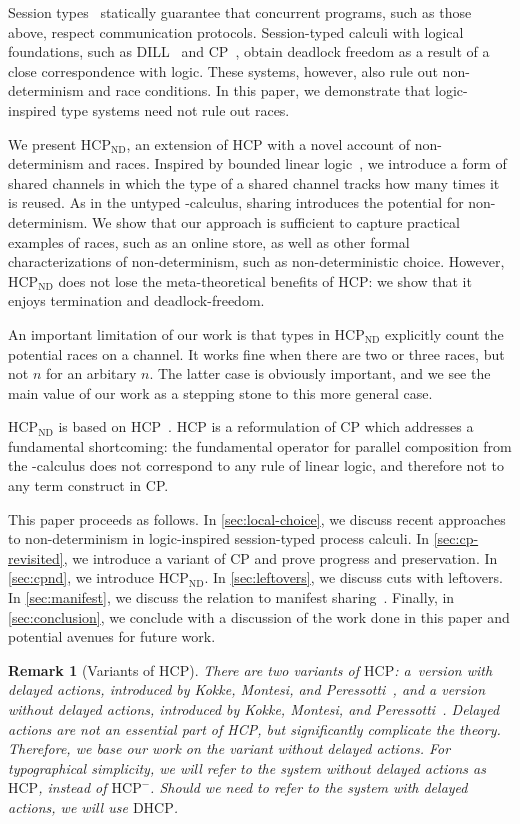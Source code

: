 \documentclass{lmcs}
\providecommand{\dhcp}{\ensuremath{\text{DHCP}}\xspace}
\providecommand{\hcp}{\ensuremath{\text{HCP}}\xspace}
\providecommand{\nodcap}{\ensuremath{\hcp_{\text{ND}}}\xspace}
\providecommand{\piDILL}{\textpi DILL\xspace}
\providecommand{\cp}{CP\xspace}
\newtheorem*{remark}{Remark}
\begin{document}
Session types~\cite{honda1993} statically guarantee that concurrent programs, such as those above, respect communication protocols. Session-typed calculi with logical foundations, such as \piDILL~\cite{caires2010} and CP~\cite{wadler2012}, obtain deadlock freedom as a result of a close correspondence with logic. These systems, however, also rule out non-determinism and race conditions. In this paper, we demonstrate that logic-inspired type systems need not rule out races.

We present \nodcap, an extension of \hcp with a novel account of non-determinism and races. Inspired by bounded linear logic~\cite{girard1992}, we introduce a form of shared channels in which the type of a shared channel tracks how many times it is reused. As in the untyped \textpi-calculus, sharing introduces the potential for non-determinism. We show that our approach is sufficient to capture practical examples of races, such as an online store, as well as other formal characterizations of non-determinism, such as non-deterministic choice.  However, \nodcap does not lose the meta-theoretical benefits of \hcp: we show that it enjoys termination and deadlock-freedom.

An important limitation of our work is that types in \nodcap explicitly count the potential races on a channel.  It works fine when there are two or three races, but not $n$ for an arbitary $n$.  The latter case is obviously important, and we see the main value of our work as a stepping stone to this more general case.

\nodcap is based on \hcp~\cite{kokke2018tlla,kokke2019pacmpl}. \hcp is a reformulation of CP which addresses a fundamental shortcoming: the fundamental operator for parallel composition from the \textpi-calculus does not correspond to any rule of linear logic, and therefore not to any term construct in CP.

This paper proceeds as follows. In \cref{sec:local-choice}, we discuss recent approaches to non-determinism in logic-inspired session-typed process calculi. In \cref{sec:cp-revisited}, we introduce a variant of \cp and prove progress and preservation. In \cref{sec:cpnd}, we introduce \nodcap.  In \cref{sec:leftovers}, we discuss cuts with leftovers. In \cref{sec:manifest}, we discuss the relation to manifest sharing~\cite{balzer2017}. Finally, in \cref{sec:conclusion}, we conclude with a discussion of the work done in this paper and potential avenues for future work.

\begin{remark}[Variants of \hcp]
  There are two variants of \hcp: a~version with delayed actions, introduced by Kokke, Montesi, and Peressotti~\cite{kokke2019pacmpl}, and a version without delayed actions, introduced by Kokke, Montesi, and Peressotti~\cite{kokke2018tlla}.
  Delayed actions are not an essential part of HCP, but significantly complicate the theory. Therefore, we base our work on the variant without delayed actions. For typographical simplicity, we will refer to the system without delayed actions as \hcp, instead of $\hcp^{-}$. Should we need to refer to the system with delayed actions, we will use \dhcp.
\end{remark}
\end{document}
